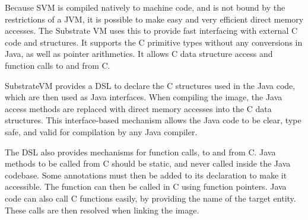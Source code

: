 \documentclass[twoside,11pt,a4paper]{article}
\newcommand{\java}[1]{\textsf{#1}}
\begin{document}
Because SVM is compiled natively to machine code, and is not bound by the restrictions of a JVM, it is possible to make easy and very efficient direct memory accesses. The Substrate VM uses this to provide fast interfacing with external C code and structures. It supports the C primitive types without any conversions in Java, as well as pointer arithmetics. It allows C data structure access and function calls to and from C.

SubstrateVM provides a DSL to declare the C structures used in the Java code, which are then used as Java \java{interface}s. When compiling the image, the Java access methods are replaced with direct memory accesses into the C data structures. This \java{interface}-based mechanism allows the Java code to be clear, type safe, and valid for compilation by any Java compiler.

The DSL also provides mechanisms for function calls, to and from C. Java methods to be called from C should be \java{static}, and never called inside the Java codebase. Some annotations must then be added to its declaration to make it accessible. The function can then be called in C using function pointers. Java code can also call C functions easily, by providing the name of the target entity. These calls are then resolved when linking the image.



\end{document}
